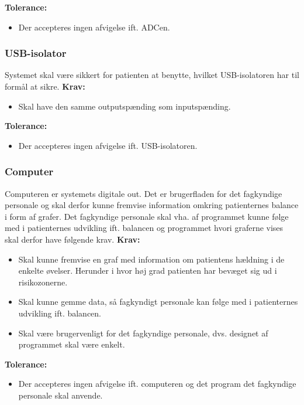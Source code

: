 \textbf{Tolerance:}
\begin{itemize}
\item Der accepteres ingen afvigelse ift. ADCen.
\end{itemize}

\subsubsection{USB-isolator}
Systemet skal være sikkert for patienten at benytte, hvilket USB-isolatoren har til formål at sikre.
\textbf{Krav:}
\begin{itemize}
\item Skal have den samme outputspænding som inputspænding. 
\end{itemize}

\textbf{Tolerance:}
\begin{itemize}
\item Der accepteres ingen afvigelse ift. USB-isolatoren. 
\end{itemize}

\subsubsection{Computer}
Computeren er systemets digitale out. Det er brugerfladen for det fagkyndige personale og skal derfor kunne fremvise information omkring patienternes balance i form af grafer. Det fagkyndige personale skal vha. af programmet kunne følge med i patienternes udvikling ift. balancen og programmet hvori graferne vises skal derfor have følgende krav.
\textbf{Krav:}
\begin{itemize}
\item Skal kunne fremvise en graf med information om patientens hældning i de enkelte øvelser. Herunder i hvor høj grad patienten har bevæget sig ud i risikozonerne. 
\item Skal kunne gemme data, så fagkyndigt personale kan følge med i patienternes udvikling ift. balancen.
\item Skal være brugervenligt for det fagkyndige personale, dvs. designet af programmet skal være enkelt. 
\end{itemize}

\textbf{Tolerance:}
\begin{itemize}
\item Der accepteres ingen afvigelse ift. computeren og det program det fagkyndige personale skal anvende. 
\end{itemize}


